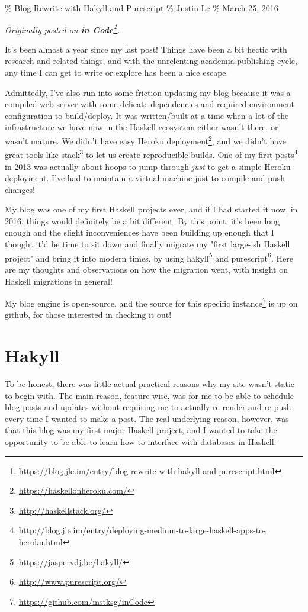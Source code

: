\documentclass[]{article}
\renewcommand{\href}[2]{#2\footnote{\url{#1}}}
\begin{document}
\% Blog Rewrite with Hakyll and Purescript \% Justin Le \% March 25, 2016

\emph{Originally posted on
\textbf{\href{https://blog.jle.im/entry/blog-rewrite-with-hakyll-and-purescript.html}{in
Code}}.}

It's been almost a year since my last post! Things have been a bit hectic with
research and related things, and with the unrelenting academia publishing cycle,
any time I can get to write or explore has been a nice escape.

Admittedly, I've also run into some friction updating my blog because it was a
compiled web server with some delicate dependencies and required environment
configuration to build/deploy. It was written/built at a time when a lot of the
infrastructure we have now in the Haskell ecosystem either wasn't there, or
wasn't mature. We didn't have easy \href{https://haskellonheroku.com/}{Heroku
deployment}, and we didn't have great tools like
\href{http://haskellstack.org/}{stack} to let us create reproducible builds. One
of my
\href{http://blog.jle.im/entry/deploying-medium-to-large-haskell-apps-to-heroku.html}{first
posts} in 2013 was actually about hoops to jump through \emph{just} to get a
simple Heroku deployment. I've had to maintain a virtual machine just to compile
and push changes!

My blog was one of my first Haskell projects ever, and if I had started it now,
in 2016, things would definitely be a bit different. By this point, it's been
long enough and the slight inconveniences have been building up enough that I
thought it'd be time to sit down and finally migrate my "first large-ish Haskell
project" and bring it into modern times, by using
\href{https://jaspervdj.be/hakyll/}{hakyll} and
\href{http://www.purescript.org/}{purescript}. Here are my thoughts and
observations on how the migration went, with insight on Haskell migrations in
general!

My blog engine is open-source, and the
\href{https://github.com/mstksg/inCode}{source for this specific instance} is up
on github, for those interested in checking it out!

\section{Hakyll}

To be honest, there was little actual practical reasons why my site wasn't
static to begin with. The main reason, feature-wise, was for me to be able to
schedule blog posts and updates without requiring me to actually re-render and
re-push every time I wanted to make a post. The real underlying reason, however,
was that this blog was my first major Haskell project, and I wanted to take the
opportunity to be able to learn how to interface with databases in Haskell.
\end{document}
